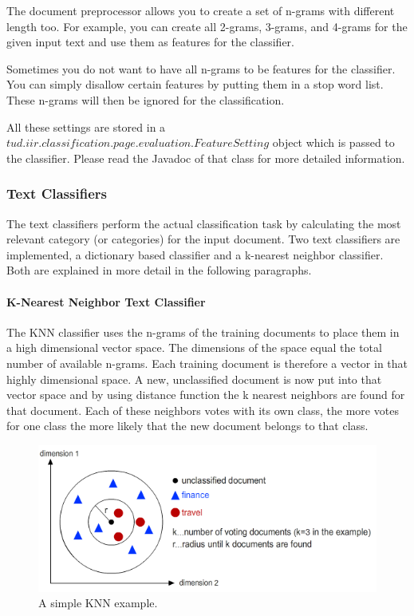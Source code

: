 \documentclass[a4paper,twoside]{book}      %
\begin{document}
The document preprocessor allows you to create a set of n-grams with different length too. For example, you can create all 2-grams, 3-grams, and 4-grams for the given input text and use them as features for the classifier.

Sometimes you do not want to have all n-grams to be features for the classifier. You can simply disallow certain features by putting them in a stop word list. These n-grams will then be ignored for the classification.

All these settings are stored in a $tud.iir.classification.page.evaluation.FeatureSetting$ object which is passed to the classifier. Please read the Javadoc of that class for more detailed information.

\subsubsection{Text Classifiers}
The text classifiers perform the actual classification task by calculating the most relevant category (or categories) for the input document. Two text classifiers are implemented, a dictionary based classifier and a k-nearest neighbor classifier. Both are explained in more detail in the following paragraphs.

\paragraph{K-Nearest Neighbor Text Classifier}
The KNN classifier uses the n-grams of the training documents to place them in a high dimensional vector space. The dimensions of the space equal the total number of available n-grams. Each training document is therefore a vector in that highly dimensional space. A new, unclassified document is now put into that vector space and by using distance function the k nearest neighbors are found for that document. Each of these neighbors votes with its own class, the more votes for one class the more likely that the new document belongs to that class.

\begin{figure}
\includegraphics[width=\textwidth]{img/knn.png}
\caption{A simple KNN example.}
\label{fig:knn}
\end{figure}
\end{document}
